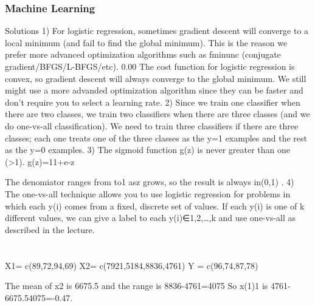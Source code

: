 \begin{frame}
	\frametitle{Machine Learning} 
	\large 

Solutions
1)
For logistic regression, sometimes gradient descent will converge to a local minimum (and fail to find the global minimum). This is the reason we prefer more advanced optimization algorithms such as fminunc (conjugate gradient/BFGS/L-BFGS/etc).  0.00
The cost function for logistic regression is convex, so gradient descent will always converge to the global minimum. We still might use a more advanded optimization algorithm since they can be faster and don't require you to select a learning rate. 
2)
Since we train one classifier when there are two classes, we train two classifiers when there are three classes (and we do one-vs-all classification).  
We need to train three classifiers if there are three classes; each one treats one of the three classes as the y=1 examples and the rest as the y=0 examples. 
3)
The sigmoid function g(z) is never greater than one (>1). g(z)=11+e-z  
 
The denomiator ranges from  to1 asz grows, so the result is always in(0,1) . 
4)
The one-vs-all technique allows you to use logistic regression for problems in which each y(i) comes from a fixed, discrete set of values. 
If each y(i) is one of k different values, we can give a label to each y(i)∈{1,2,…,k} and use one-vs-all as described in the lecture. 
\end{frame}



\section{}

X1= c(89,72,94,69)
X2= c(7921,5184,8836,4761)
Y = c(96,74,87,78)



The mean of x2 is 6675.5 and the range is 8836-4761=4075 So x(1)1 is 4761-6675.54075=-0.47.


